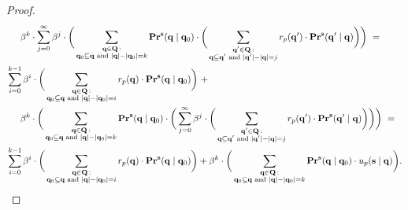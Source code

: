 \begin{proof}
\begin{align*}
& \hspace{15pt} \beta^k \cdot \sum_{j=0}^{\infty}\beta^{j} \cdot  \bigg(
\sum_{\substack{\mathbf{q} \in \mathbf{Q} \,: \\ \mathbf{q}_0 \subseteq \mathbf{q} \text{ {\rm and} } |\mathbf{q}| - |\mathbf{q}_0| = k}} \mathbf{Pr}^{\mathbf{s}}(\mathbf{q} \mid \mathbf{q}_0) \cdot
\bigg(\sum_{\substack{\mathbf{q}' \in \mathbf{Q} \,: \\ \mathbf{q} \subseteq \mathbf{q}' \text{ {\rm and} } |\mathbf{q}'| - |\mathbf{q}| = j}} r_p(\mathbf{q}') \cdot 
\mathbf{Pr}^{\mathbf{s}}(\mathbf{q}' \mid \mathbf{q})\bigg)\bigg)\ = \\
& \sum_{i=0}^{k-1} \beta^i \cdot \bigg(\sum_{\substack{\mathbf{q} \in \mathbf{Q} \,: \\ \mathbf{q}_0 \subseteq \mathbf{q} \text{ {\rm and} } |\mathbf{q}| - |\mathbf{q}_0| = i}} r_p(\mathbf{q}) \cdot \mathbf{Pr}^{\mathbf{s}}(\mathbf{q} \mid \mathbf{q}_0)\bigg) \ + \\
& \hspace{15pt}
 \beta^k \cdot \bigg(\sum_{\substack{\mathbf{q} \in \mathbf{Q} \,: \\ \mathbf{q}_0 \subseteq \mathbf{q} \text{ {\rm and} } |\mathbf{q}| - |\mathbf{q}_0| = k}} \mathbf{Pr}^{\mathbf{s}}(\mathbf{q} \mid \mathbf{q}_0) \cdot \bigg(\sum_{j=0}^{\infty}\beta^{j} \cdot  \bigg(\sum_{\substack{\mathbf{q}' \in \mathbf{Q} \,: \\ \mathbf{q} \subseteq \mathbf{q}' \text{ {\rm and} } |\mathbf{q}'| - |\mathbf{q}| = j}} r_p(\mathbf{q}') \cdot 
\mathbf{Pr}^{\mathbf{s}}(\mathbf{q}' \mid \mathbf{q})\bigg)\bigg)\bigg)\ = \\
& \sum_{i=0}^{k-1} \beta^i \cdot \bigg(\sum_{\substack{\mathbf{q} \in \mathbf{Q} \,: \\ \mathbf{q}_0 \subseteq \mathbf{q} \text{ {\rm and} } |\mathbf{q}| - |\mathbf{q}_0| = i}} r_p(\mathbf{q}) \cdot \mathbf{Pr}^{\mathbf{s}}(\mathbf{q} \mid \mathbf{q}_0)\bigg) +  \beta^k \cdot 
\bigg(\sum_{\substack{\mathbf{q} \in \mathbf{Q} \,: \\ \mathbf{q}_0 \subseteq \mathbf{q} \text{ {\rm and} } |\mathbf{q}| - |\mathbf{q}_0| = k}}
\mathbf{Pr}^{\mathbf{s}}(\mathbf{q} \mid \mathbf{q}_0) \cdot u_p(\mathbf{s} \mid \mathbf{q})\bigg).
\end{align*}
\end{proof}




